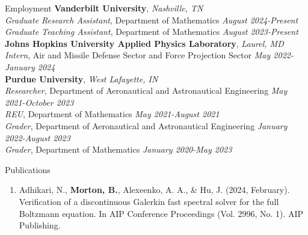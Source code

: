 \documentclass{CV} %
\begin{document}

\begin{rSection}{Employment}
    \textbf{Vanderbilt University}, \textit{Nashville, TN} \\
    \textit{Graduate Research Assistant}, Department of Mathematics \hfill \textit{August 2024-Present} \\ 
    \textit{Graduate Teaching Assistant}, Department of Mathematics \hfill \textit{August 2023-Present}\\ 
    \newline 
    \textbf{Johns Hopkins University Applied Physics Laboratory}, \textit{Laurel, MD} \\
    \textit{Intern}, Air and Missile Defense Sector and Force Projection Sector \hfill \textit{May 2022-January 2024}\\ 
    \newline 
    \textbf{Purdue University}, \textit{West Lafayette, IN} \\ 
    \textit{Researcher}, Department of Aeronautical and Astronautical Engineering \hfill \textit{May 2021-October 2023} \\ 
    \textit{REU}, Department of Mathematics \hfill \textit{May 2021-August 2021} \\ 
    \textit{Grader}, Department of Aeronautical and Astronautical Engineering \hfill \textit{January 2022-August 2023} \\ 
    \textit{Grader}, Department of Mathematics \hfill \textit{January 2020-May 2023}
\end{rSection}


\begin{rSection}{Publications}

\begin{enumerate}
    \item Adhikari, N., \textbf{Morton, B.}, Alexeenko, A. A., \& Hu, J. (2024, February). Verification of a discontinuous Galerkin fast spectral solver for the full Boltzmann equation. In AIP Conference Proceedings (Vol. 2996, No. 1). AIP Publishing.
\end{enumerate}

\end{rSection}
\end{document}

